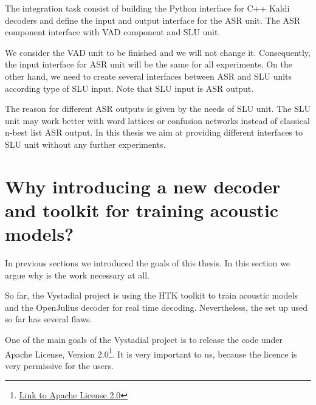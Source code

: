 The integration task consist of building the Python interface for C++ Kaldi decoders and define the input and output interface for the ASR unit. The ASR component interface with VAD component and SLU unit. 

We consider the VAD unit to be finished and we will not change it. Consequently, the input interface for ASR unit will be the same for all experiments. On the other hand, we need to create several interfaces between ASR and SLU units according type of SLU input. Note that SLU input is ASR output. 

The reason for different ASR outputs is given by the needs of SLU unit. The SLU unit may work better with word lattices or confusion networks instead of classical n-best list ASR output. In this thesis we aim at providing different interfaces to SLU unit without any further experiments.



    
\section{Why introducing a new decoder and toolkit for training acoustic models?} 
\label{sec:why}
In previous sections we introduced the goals of this thesis. In this section we argue why is the work necessary at all.

So far, the Vystadial project is using the HTK toolkit to train acoustic models and the OpenJulius decoder for real time decoding.
Nevertheless, the set up used so far has several flaws.

One of the main goals of the Vystadial project is to release the code under Apache License, Version 2.0\footnote{\href{http://www.apache.org/licenses/LICENSE-2.0.html}{Link to Apache License 2.0}}. It is very important to us, because the licence is very permissive for the users. 

